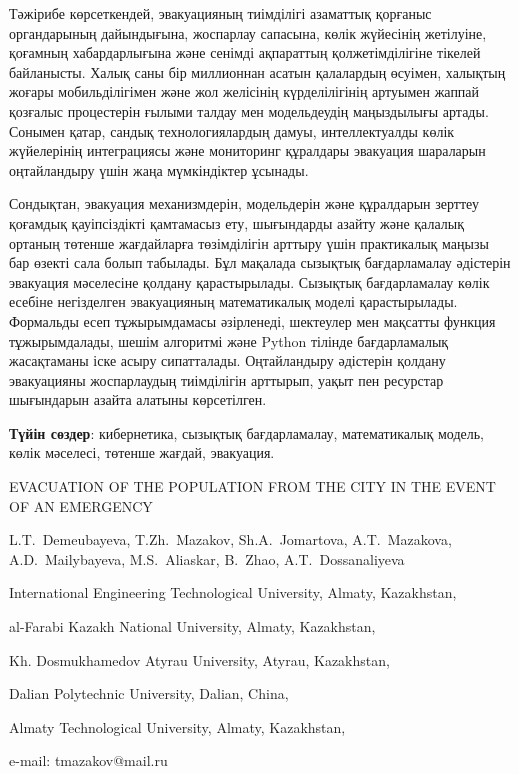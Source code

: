 Тәжірибе көрсеткендей, эвакуацияның тиімділігі азаматтық қорғаныс
органдарының дайындығына, жоспарлау сапасына, көлік жүйесінің жетілуіне,
қоғамның хабардарлығына және сенімді ақпараттың қолжетімділігіне тікелей
байланысты. Халық саны бір миллионнан асатын қалалардың өсуімен,
халықтың жоғары мобильділігімен және жол желісінің күрделілігінің
артуымен жаппай қозғалыс процестерін ғылыми талдау мен модельдеудің
маңыздылығы артады. Сонымен қатар, сандық технологиялардың дамуы,
интеллектуалды көлік жүйелерінің интеграциясы және мониторинг құралдары
эвакуация шараларын оңтайландыру үшін жаңа мүмкіндіктер ұсынады.

Сондықтан, эвакуация механизмдерін, модельдерін және құралдарын зерттеу
қоғамдық қауіпсіздікті қамтамасыз ету, шығындарды азайту және қалалық
ортаның төтенше жағдайларға төзімділігін арттыру үшін практикалық маңызы
бар өзекті сала болып табылады. Бұл мақалада сызықтық бағдарламалау
әдістерін эвакуация мәселесіне қолдану қарастырылады. Сызықтық
бағдарламалау көлік есебіне негізделген эвакуацияның математикалық
моделі қарастырылады. Формальды есеп тұжырымдамасы әзірленеді, шектеулер
мен мақсатты функция тұжырымдалады, шешім алгоритмі және Python тілінде
бағдарламалық жасақтаманы іске асыру сипатталады. Оңтайландыру әдістерін
қолдану эвакуацияны жоспарлаудың тиімділігін арттырып, уақыт пен
ресурстар шығындарын азайта алатыны көрсетілген.

{\bfseries Түйін сөздер}: кибернетика, сызықтық бағдарламалау,
математикалық модель, көлік мәселесі, төтенше жағдай, эвакуация.

\begin{header}
EVACUATION OF THE POPULATION FROM THE CITY IN THE EVENT OF AN EMERGENCY

L.T.~Demeubayeva,
T.Zh.~Mazakov\envelope,
Sh.A.~Jomartova,
A.T.~Mazakova,
A.D.~Mailybayeva,
M.S.~Aliaskar,
B.~Zhao,
A.T.~Dossanaliyeva
\end{header}

\begin{affil}
International Engineering Technological University, Almaty, Kazakhstan,

al-Farabi Kazakh National University, Almaty, Kazakhstan,

Kh. Dosmukhamedov Atyrau University, Atyrau, Kazakhstan,

Dalian Polytechnic University, Dalian, China,

Almaty Technological University, Almaty, Kazakhstan,

e-mail: tmazakov@mail.ru
\end{affil}

